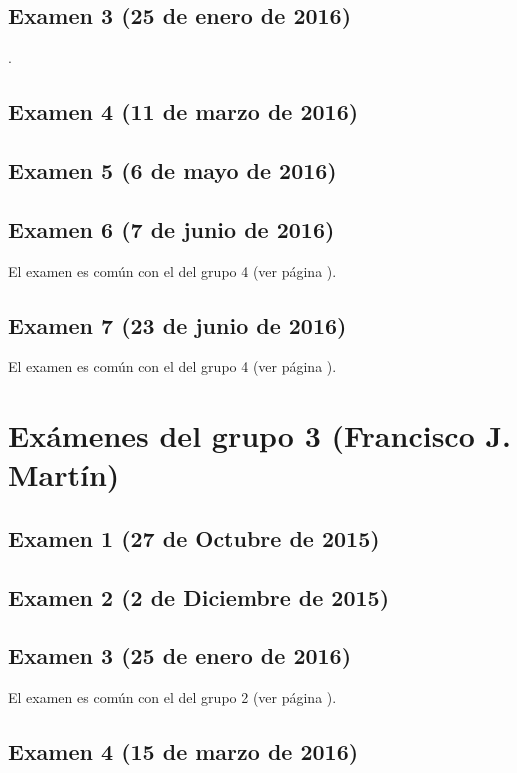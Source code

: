 \documentclass[a4paper,12pt,twoside]{book}
\begin{document}
\subsection{Examen 3 (25 de enero de 2016)}
 \label{examen_15_16_2_3}.
\subsection{Examen 4 (11 de marzo de 2016)}
\subsection{Examen 5 (6 de mayo de 2016)}
\subsection{Examen 6 (7 de junio de 2016)} 
El examen es común con el del grupo 4 (ver página \pageref{examen_15_16_4_6}).
\subsection{Examen 7 (23 de junio de 2016)}
El examen es común con el del grupo 4 (ver página \pageref{examen_15_16_4_7}).

\section{Exámenes del grupo 3 (Francisco J. Martín)}
\subsection{Examen 1 (27 de Octubre de 2015)}
\subsection{Examen 2 (2 de Diciembre de 2015)}
\subsection{Examen 3 (25 de enero de 2016)}
El examen es común con el del grupo 2 (ver página \pageref{examen_15_16_2_3}).
\subsection{Examen 4 (15 de marzo de 2016)}
\end{document}

